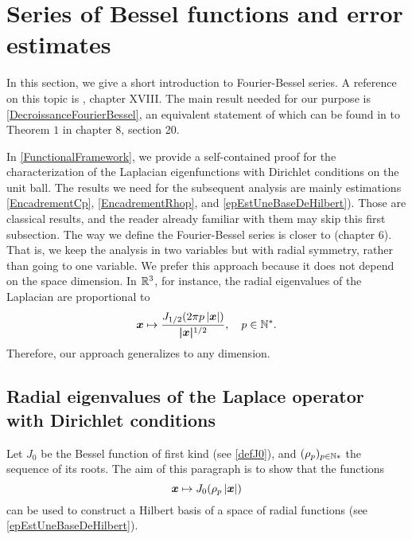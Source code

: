 \documentclass[11pt,a4paper]{article}
\begin{document}
\section{Series of Bessel functions and error estimates}
\label{sec:FourierBesselSeries}
In this section, we give a short introduction to Fourier-Bessel series. A reference on this topic is \cite{watson1995treatise}, chapter XVIII. 
The main result needed for our purpose is \autoref{DecroissanceFourierBessel},  an equivalent statement of which can be found in to Theorem $1$ in \cite{tolstov2012fourier} chapter 8, section 20. 

In \autoref{FunctionalFramework}, we provide a self-contained proof for the characterization of the Laplacian eigenfunctions with Dirichlet conditions on the unit ball. The results we need for the subsequent analysis are mainly estimations \eqref{EncadrementCp}, \autoref{EncadrementRhop}, and \autoref{epEstUneBaseDeHilbert}). Those are classical results, and the reader already familiar with them may skip this first subsection. 
The way we define the Fourier-Bessel series is closer to \cite{wolf2013integral} (chapter 6). That is, we keep the analysis in two variables but with radial symmetry, rather than going to one variable. We prefer this approach because it does not depend on the space dimension. In $\mathbb{R}^3$, for instance, the radial eigenvalues of the Laplacian are proportional to
\[  \boldsymbol{x} \mapsto \dfrac{J_{1/2}(2\pi p\left\lvert \boldsymbol{x} \right\rvert)}{\boldsymbol{|x|}^{1/2}}, \quad  p\in\mathbb{N}^*.\] 
Therefore, our approach generalizes \cite{Alouges2015} to any dimension.  
\subsection{Radial eigenvalues of the Laplace operator with Dirichlet conditions}
\label{FunctionalFramework}
Let $J_0$ be the Bessel function of first kind (see \autoref{defJ0}), and $(\rho_p)_{p \in \mathbb{N}*}$ the sequence of its roots. 
The aim of this paragraph is to show that the functions 
\[ \boldsymbol{x} \mapsto J_0(\rho_p \left\lvert \boldsymbol{x} \right\rvert)\]
can be used to construct a Hilbert basis of a space of radial functions (see \autoref{epEstUneBaseDeHilbert}).
\end{document}
